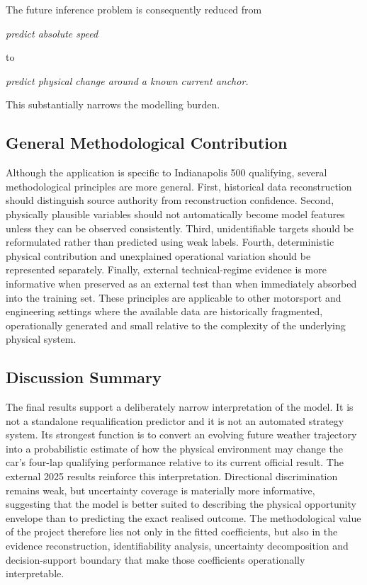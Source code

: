 The future inference problem is consequently reduced from

\begin{center}\textit{predict absolute speed}\end{center}

to

\begin{center}\textit{predict physical change around a known current anchor.}\end{center}

This substantially narrows the modelling burden.

\subsection{General Methodological Contribution}
Although the application is specific to Indianapolis 500 qualifying, several methodological principles are more general. First, historical data reconstruction should distinguish source authority from reconstruction confidence. Second, physically plausible variables should not automatically become model features unless they can be observed consistently. Third, unidentifiable targets should be reformulated rather than predicted using weak labels. Fourth, deterministic physical contribution and unexplained operational variation should be represented separately. Finally, external technical-regime evidence is more informative when preserved as an external test than when immediately absorbed into the training set. These principles are applicable to other motorsport and engineering settings where the available data are historically fragmented, operationally generated and small relative to the complexity of the underlying physical system.

\subsection{Discussion Summary}
The final results support a deliberately narrow interpretation of the model. It is not a standalone requalification predictor and it is not an automated strategy system. Its strongest function is to convert an evolving future weather trajectory into a probabilistic estimate of how the physical environment may change the car's four-lap qualifying performance relative to its current official result. The external 2025 results reinforce this interpretation. Directional discrimination remains weak, but uncertainty coverage is materially more informative, suggesting that the model is better suited to describing the physical opportunity envelope than to predicting the exact realised outcome. The methodological value of the project therefore lies not only in the fitted coefficients, but also in the evidence reconstruction, identifiability analysis, uncertainty decomposition and decision-support boundary that make those coefficients operationally interpretable.

